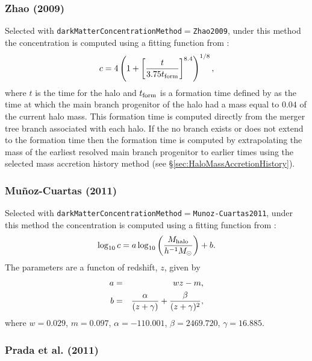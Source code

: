 \subsubsection{Zhao (2009)}

Selected with {\tt darkMatterConcentrationMethod}$=${\tt Zhao2009}, under this method the concentration is computed using a fitting function from \cite{zhao_accurate_2009}:
\begin{equation}
 c = 4 \left(1 + \left[ {t  \over 3.75 t_{\rm form}}\right]^{8.4}\right)^{1/8},
\end{equation}
where $t$ is the time for the halo and $t_{\rm form}$ is a formation time defined by \cite{zhao_accurate_2009} as the time at which the main branch progenitor of the halo had a mass equal to $0.04$ of the current halo mass. This formation time is computed directly from the merger tree branch associated with each halo. If the no branch exists or does not extend to the formation time then the formation time is computed by extrapolating the mass of the earliest resolved main branch progenitor to earlier times using the selected mass accretion history method (see \S\ref{sec:HaloMassAccretionHistory}).

\subsubsection{Mu\~noz-Cuartas (2011)}

Selected with {\tt darkMatterConcentrationMethod}$=${\tt Munoz-Cuartas2011}, under this method the concentration is computed using a fitting function from \cite{munoz-cuartas_redshift_2011}:
\begin{equation}
\log_{10} c = a \log_{10} \left( {M_{\rm halo} \over h^{-1}M_\odot} \right) + b.
\end{equation}
The parameters are a functon of redshift, $z$, given by
\begin{eqnarray}
a &=& wz-m, \\
b &=& {\alpha \over (z+\gamma)} + {\beta \over (z+\gamma)^2},
\end{eqnarray}
where $w=0.029$, $m=0.097$, $\alpha=-110.001$, $\beta=2469.720$, $\gamma=16.885$.

\subsubsection{Prada et al. (2011)}

